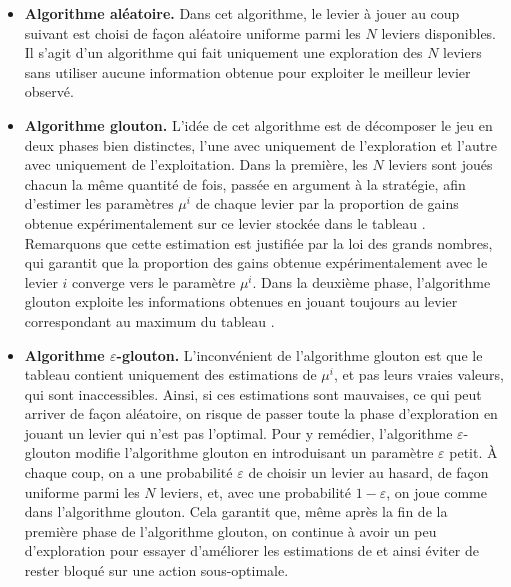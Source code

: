 \documentclass[a4paper,12pt]{article}
\begin{document}
\begin{itemize}[label=\textbullet, leftmargin=*]
\item \textbf{Algorithme aléatoire.} Dans cet algorithme, le levier à jouer au coup suivant est choisi de façon aléatoire uniforme parmi les $N$ leviers disponibles. Il s'agit d'un algorithme qui fait uniquement une exploration des $N$ leviers sans utiliser aucune information obtenue pour exploiter le meilleur levier observé.

\item \textbf{Algorithme glouton.} L'idée de cet algorithme est de décomposer le jeu en deux phases bien distinctes, l'une avec uniquement de l'exploration et l'autre avec uniquement de l'exploitation. Dans la première, les $N$ leviers sont joués chacun la même quantité de fois, passée en argument à la stratégie, afin d'estimer les paramètres $\mu^i$ de chaque levier par la proportion de gains obtenue expérimentalement sur ce levier stockée dans le tableau \verb@mu@. Remarquons que cette estimation est justifiée par la loi des grands nombres, qui garantit que la proportion des gains obtenue expérimentalement avec le levier $i$ converge vers le paramètre $\mu^i$. Dans la deuxième phase, l'algorithme glouton exploite les informations obtenues en jouant toujours au levier correspondant au maximum du tableau \verb@mu@.

\item \textbf{Algorithme $\varepsilon$-glouton.} L'inconvénient de l'algorithme glouton est que le tableau \verb@mu@ contient uniquement des estimations de $\mu^i$, et pas leurs vraies valeurs, qui sont inaccessibles. Ainsi, si ces estimations sont mauvaises, ce qui peut arriver de façon aléatoire, on risque de passer toute la phase d'exploration en jouant un levier qui n'est pas l'optimal. Pour y remédier, l'algorithme $\varepsilon$-glouton modifie l'algorithme glouton en introduisant un paramètre $\varepsilon$ petit. À chaque coup, on a une probabilité $\varepsilon$ de choisir un levier au hasard, de façon uniforme parmi les $N$ leviers, et, avec une probabilité $1 - \varepsilon$, on joue comme dans l'algorithme glouton. Cela garantit que, même après la fin de la première phase de l'algorithme glouton, on continue à avoir un peu d'exploration pour essayer d'améliorer les estimations de \verb@mu@ et ainsi éviter de rester bloqué sur une action sous-optimale.


\end{itemize}
\end{document}
